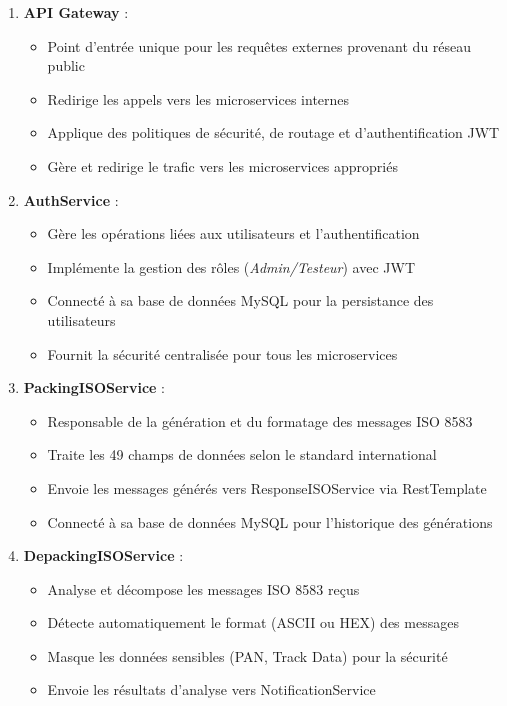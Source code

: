 \begin{enumerate}[label=\alph*)]
    \item \textbf{API Gateway} :
    \begin{itemize}[label=\textbullet]
        \item Point d'entrée unique pour les requêtes externes provenant du réseau public
        \item Redirige les appels vers les microservices internes
        \item Applique des politiques de sécurité, de routage et d'authentification JWT
        \item Gère et redirige le trafic vers les microservices appropriés
    \end{itemize}

    \item \textbf{AuthService} :
    \begin{itemize}[label=\textbullet]
        \item Gère les opérations liées aux utilisateurs et l'authentification
        \item Implémente la gestion des rôles (\textit{Admin/Testeur}) avec JWT
        \item Connecté à sa base de données MySQL pour la persistance des utilisateurs
        \item Fournit la sécurité centralisée pour tous les microservices
    \end{itemize}

    \item \textbf{PackingISOService} :
    \begin{itemize}[label=\textbullet]
        \item Responsable de la génération et du formatage des messages ISO 8583
        \item Traite les 49 champs de données selon le standard international
        \item Envoie les messages générés vers ResponseISOService via RestTemplate
        \item Connecté à sa base de données MySQL pour l'historique des générations
    \end{itemize}

    \item \textbf{DepackingISOService} :
    \begin{itemize}[label=\textbullet]
        \item Analyse et décompose les messages ISO 8583 reçus
        \item Détecte automatiquement le format (ASCII ou HEX) des messages
        \item Masque les données sensibles (PAN, Track Data) pour la sécurité
        \item Envoie les résultats d'analyse vers NotificationService
    \end{itemize}


\end{enumerate}
